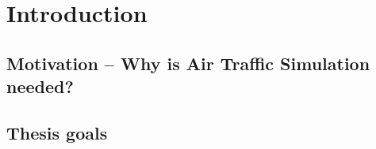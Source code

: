 \chapter{Introduction}

\section{Motivation – Why is Air Traffic Simulation needed?}
\section{Thesis goals}